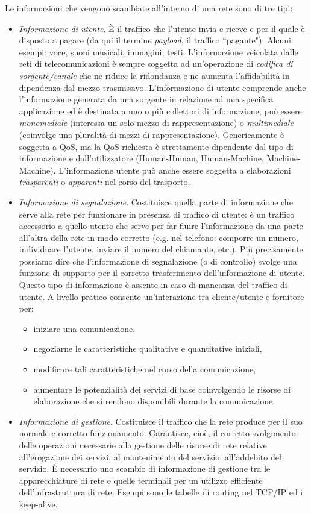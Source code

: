 \noindent Le informazioni che vengono scambiate all'interno di una rete sono di tre tipi:
\begin{itemize}
	\item \textit{Informazione di utente}. È il traffico che l'utente invia e riceve e per il quale è disposto a pagare (da qui il termine \textit{payload}, il traffico \textquotedblleft pagante"). Alcuni esempi: voce, suoni musicali, immagini, testi. L'informazione veicolata dalle reti di telecomunicazioni è sempre soggetta ad  un'operazione di \textit{codifica di sorgente/canale} che ne riduce la ridondanza e ne aumenta l'affidabilità in dipendenza dal mezzo trasmissivo. L'informazione di utente comprende anche l'informazione generata da una sorgente in relazione ad una specifica applicazione ed è destinata a uno o più collettori di informazione; può essere \textit{monomediale} (interessa un solo mezzo di rappresentazione) o \textit{multimediale} (coinvolge una pluralità di mezzi di rappresentazione). Genericamente è soggetta a QoS, ma la QoS richiesta è strettamente dipendente dal tipo di informazione e dall'utilizzatore (Human-Human, Human-Machine, Machine-Machine). L'informazione utente può anche essere soggetta a elaborazioni \textit{trasparenti} o \textit{apparenti} nel corso del trasporto.
	
	\item \textit{Informazione di segnalazione}. Costituisce quella parte di informazione che serve alla rete per funzionare in presenza di traffico di utente: è un traffico accessorio a quello utente che serve per far fluire l'informazione da una parte all'altra della rete in modo corretto (e.g. nel telefono: comporre un numero, individuare l'utente, inviare il numero del chiamante, etc.). Più precisamente possiamo dire che l'informazione di segnalazione (o di controllo) svolge una funzione di supporto per il corretto trasferimento dell'informazione di utente. Questo tipo di informazione è assente in caso di mancanza del traffico di utente. A livello pratico consente un'interazione tra cliente/utente e fornitore per:
		\begin{itemize}
			\item iniziare una comunicazione,
			\item negoziarne le caratteristiche qualitative e quantitative iniziali,
			\item modificare tali caratteristiche nel corso della comunicazione,
			\item aumentare le potenzialità dei servizi di base coinvolgendo le risorse di elaborazione che si rendono disponibili durante la comunicazione.
		\end{itemize}
	
	\item \textit{Informazione di gestione}. Costituisce il traffico che la rete produce per il suo normale e corretto funzionamento. Garantisce, cioè, il corretto svolgimento delle operazioni necessarie alla gestione delle risorse di rete relative all'erogazione dei servizi, al mantenimento del servizio, all'addebito del servizio. È necessario uno scambio di informazione di gestione tra le apparecchiature di rete e quelle terminali per un utilizzo efficiente dell'infrastruttura di rete. Esempi sono le tabelle di routing nel TCP/IP ed i keep-alive.
\end{itemize}
